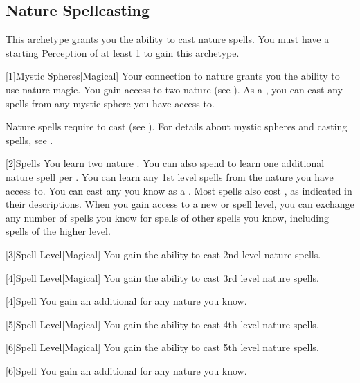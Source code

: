     \subsection{Nature Spellcasting}
        This archetype grants you the ability to cast nature spells.
        You must have a starting Perception of at least 1 to gain this archetype.

        [1]{Mystic Spheres}[Magical]
        Your connection to nature grants you the ability to use nature magic.
        You gain access to two nature  (see ).
        As a , you can cast any  spells from any mystic sphere you have access to.

        Nature spells require  to cast (see ).
        For details about mystic spheres and casting spells, see .

        [2]{Spells} You learn two nature .
        You can also spend  to learn one additional nature spell per .
        You can learn any 1st level spells from the nature  you have access to.
        You can cast any  you know as a .
        Most spells also cost , as indicated in their descriptions.
        When you gain access to a new  or spell level, you can exchange any number of spells you know for spells of other spells you know, including spells of the higher level.

        [3]{Spell Level}[Magical] You gain the ability to cast 2nd level nature spells.

        [4]{Spell Level}[Magical] You gain the ability to cast 3rd level nature spells.

        [4]{Spell} You gain an additional  for any nature  you know.

        [5]{Spell Level}[Magical] You gain the ability to cast 4th level nature spells.

        [6]{Spell Level}[Magical] You gain the ability to cast 5th level nature spells.

        [6]{Spell} You gain an additional  for any nature  you know.

